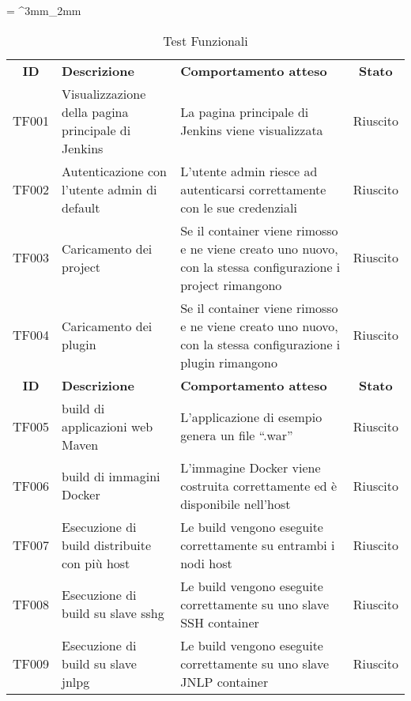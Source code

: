 \tabulinesep = ^3mm_2mm
\begin{longtabu} to \textwidth {cXXc}
    \caption[Test Funzionali]{Test Funzionali}
    \label{tab:test}
    \endlastfoot
    \rowfont{\bfseries\sffamily\leavevmode\color{white}}
    \textbf{ID} & \textbf{Descrizione} & \textbf{Comportamento atteso} & \textbf{Stato}\\
    TF001 & Visualizzazione della pagina principale di Jenkins & La pagina principale di Jenkins viene visualizzata & Riuscito\\ %
    TF002 & Autenticazione con l'utente admin di default & L'utente admin riesce ad autenticarsi correttamente con le sue credenziali & Riuscito\\ %
    TF003 & Caricamento dei \gls{project} & Se il container viene rimosso e ne viene creato uno nuovo, con la stessa configurazione i project rimangono & Riuscito\\ %
    TF004 & Caricamento dei \gls{plugin} & Se il container viene rimosso e ne viene creato uno nuovo, con la stessa configurazione i plugin rimangono & Riuscito\\ %
    \newpage
    \rowfont{\bfseries\sffamily\leavevmode\color{white}}
    \textbf{ID} & \textbf{Descrizione} & \textbf{Comportamento atteso} & \textbf{Stato}\\
    TF005 & \gls{build} di applicazioni web Maven\cite[Chapter~10]{book:maven-reference} & L'applicazione di esempio genera un file ``.\gls{war}'' & Riuscito\\ %
    TF006 & \gls{build} di immagini Docker & L'immagine Docker viene costruita correttamente ed è disponibile nell'\gls{host} & Riuscito\\ %
    TF007 & Esecuzione di \gls{build} distribuite\cite[Chapter~11]{book:jenkins-definitive}\cite{site:jenkins-distributed-builds} con più \gls{host} & Le \gls{build} vengono eseguite correttamente su entrambi i nodi \gls{host} & Riuscito\\ %
    TF008 & Esecuzione di \gls{build} su \gls{slave} \gls{sshg} & Le \gls{build} vengono eseguite correttamente su uno \gls{slave} SSH \gls{container} & Riuscito\\ %
    TF009 & Esecuzione di \gls{build} su \gls{slave} \gls{jnlpg} & Le \gls{build} vengono eseguite correttamente su uno \gls{slave} JNLP \gls{container} & Riuscito\\ %

\end{longtabu}
